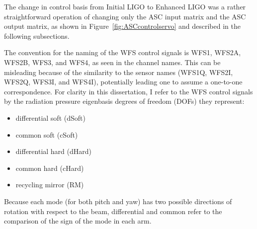 The change in control basis from Initial LIGO to Enhanced LIGO was a
rather straightforward operation of changing only the ASC input matrix
and the ASC output matrix, as shown in Figure~\ref{fig:ASCcontrolservo} and
described in the following subsections.

The convention for the naming of the WFS control signals is WFS1,
WFS2A, WFS2B, WFS3, and WFS4, as seen in the channel names. This can
be misleading because of the similarity to the sensor names (WFS1Q,
WFS2I, WFS2Q, WFS3I, and WFS4I), potentially leading one to assume a
one-to-one correspondence. For clarity in this dissertation, I refer
to the WFS control signals by the radiation pressure eigenbasis
degrees of freedom (DOFs) they represent: 
\begin{itemize}
\item differential soft (dSoft) \\
\item common soft (cSoft) \\
\item differential hard (dHard) \\
\item common hard (cHard) \\
\item recycling mirror (RM)
\end{itemize}
Because each mode (for both pitch and yaw) has two possible directions
of rotation with respect to the beam, differential and common refer to
the comparison of the sign of the mode in each arm.




